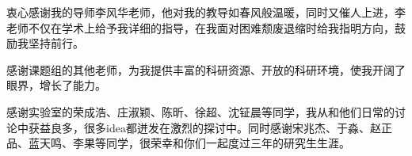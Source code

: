 
\begin{acknowledgements}
  衷心感谢我的导师李风华老师，他对我的教导如春风般温暖，同时又催人上进，李老师不仅在学术上给予我详细的指导，在我面对困难颓废退缩时给我指明方向，鼓励我坚持前行。

  感谢课题组的其他老师，为我提供丰富的科研资源、开放的科研环境，使我开阔了眼界，增长了能力。

  感谢实验室的荣成浩、庄淑颖、陈昕、徐超、沈钲晨等同学，我从和他们日常的讨论中获益良多，很多idea都迸发在激烈的探讨中。同时感谢宋兆杰、于淼、赵正品、蓝天鸣、李果等同学，很荣幸和你们一起度过三年的研究生生涯。




\end{acknowledgements}
